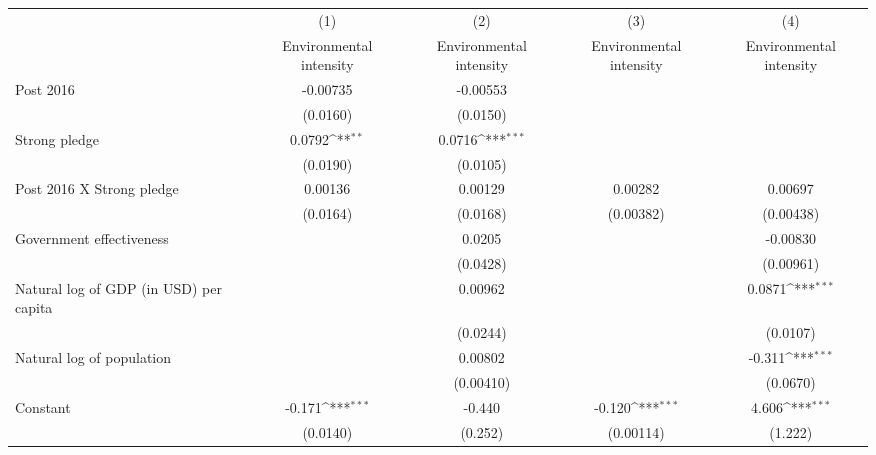 {
\def\sym#1{\ifmmode^{#1}\else\(^{#1}\)\fi}
\begin{tabular}{l*{4}{c}}
\hline\hline
                    &\multicolumn{1}{c}{(1)}&\multicolumn{1}{c}{(2)}&\multicolumn{1}{c}{(3)}&\multicolumn{1}{c}{(4)}\\
                    &\multicolumn{1}{c}{Environmental intensity}&\multicolumn{1}{c}{Environmental intensity}&\multicolumn{1}{c}{Environmental intensity}&\multicolumn{1}{c}{Environmental intensity}\\
\hline
Post 2016           &    -0.00735         &    -0.00553         &                     &                     \\
                    &    (0.0160)         &    (0.0150)         &                     &                     \\
[1em]
Strong pledge       &      0.0792\sym{**} &      0.0716\sym{***}&                     &                     \\
                    &    (0.0190)         &    (0.0105)         &                     &                     \\
[1em]
Post 2016 X Strong pledge&     0.00136         &     0.00129         &     0.00282         &     0.00697         \\
                    &    (0.0164)         &    (0.0168)         &   (0.00382)         &   (0.00438)         \\
[1em]
Government effectiveness&                     &      0.0205         &                     &    -0.00830         \\
                    &                     &    (0.0428)         &                     &   (0.00961)         \\
[1em]
Natural log of GDP (in USD) per capita&                     &     0.00962         &                     &      0.0871\sym{***}\\
                    &                     &    (0.0244)         &                     &    (0.0107)         \\
[1em]
Natural log of population&                     &     0.00802         &                     &      -0.311\sym{***}\\
                    &                     &   (0.00410)         &                     &    (0.0670)         \\
[1em]
Constant            &      -0.171\sym{***}&      -0.440         &      -0.120\sym{***}&       4.606\sym{***}\\
                    &    (0.0140)         &     (0.252)         &   (0.00114)         &     (1.222)         \\

\end{tabular}}
